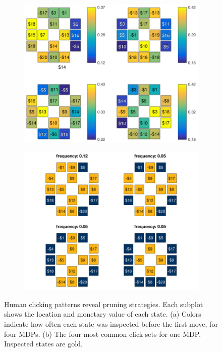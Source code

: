\documentclass[final]{beamer}
\newlength{\twocolwid}
\begin{document}
\begin{frame}[t, fragile]
\begin{columns}[t]
\begin{column}{\twocolwid}
  \begin{figure}
    \centering
    \begin{subfigure}{0.48\textwidth}
      \centering
      \label{fig:click_heat}
      \includegraphics[width=0.9\linewidth]{figs/click_locations_noFB_before1stFlight_small.png}
      \caption{}
    \end{subfigure}
    \begin{subfigure}{0.48\textwidth}
      \centering
      \label{fig:click_sets}
      \includegraphics[width=0.9\linewidth]{figs/click_sets_trial4_noFB_small.png}
      \caption{}
    \end{subfigure}
    \caption[first]{Human clicking patterns reveal pruning strategies. Each subplot shows the location and monetary value of each state. (a) Colors indicate how often each state was inspected before the first move, for four MDPs. (b) The four most common click sets for one MDP. Inspected states are gold.}
  \end{figure}



\end{column}
\end{columns}
\end{frame}
\end{document}

